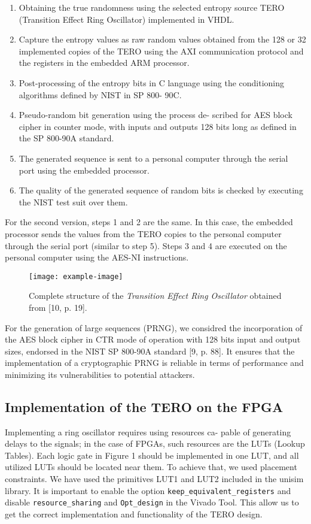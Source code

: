 \documentclass[journal]{IEEEtran}
\begin{document}
\begin{enumerate}
    \item Obtaining the true randomness using the selected entropy source TERO (Transition Effect Ring Oscillator) implemented in VHDL.
    \item Capture the entropy values as raw random values obtained from the 128 or 32 implemented copies of the TERO using the AXI communication protocol and the registers in the embedded ARM processor.
    \item Post-processing of the entropy bits in C language using the conditioning algorithms defined by NIST in SP 800- 90C.
    \item Pseudo-random bit generation using the process de- scribed for AES block cipher in counter mode, with inputs and outputs 128 bits long as defined in the SP 800-90A standard.
    \item The generated sequence is sent to a personal computer through the serial port using the embedded processor.
    \item The quality of the generated sequence of random bits is checked by executing the NIST test suit over them.
\end{enumerate}

For the second version, steps 1 and 2 are the same. In this case, the embedded processor sends the values from the TERO copies to the personal computer through the serial port (similar to step 5). Steps 3 and 4 are executed on the personal computer using the AES-NI instructions.

\begin{figure}[hbtp]
\centering
\texttt{[image: example-image]}
\caption{Complete structure of the \textit{Transition Effect Ring Oscillator} obtained from [10, p. 19].}  
\end{figure}

For the generation of large sequences (PRNG), we considred the incorporation of the AES block cipher in CTR mode of operation with 128 bits input and output sizes, endorsed in the NIST SP 800-90A standard [9, p. 88]. It ensures that the implementation of a cryptographic PRNG is reliable in terms of performance and minimizing its vulnerabilities to potential attackers.

\subsection{Implementation of the TERO on the FPGA}Implementing a ring oscillator requires using resources ca- pable of generating delays to the signals; in the case of FPGAs, such resources are the LUTs (Lookup Tables). Each logic gate in Figure 1 should be implemented in one LUT, and all utilized LUTs should be located near them. To achieve that, we used placement constraints. We have used the primitives LUT1 and LUT2 included in the unisim library. It is important to enable the option \verb+keep_equivalent_registers+ and disable \verb+resource_sharing+ and \verb+Opt_design+ in the Vivado Tool. This allow us to get the correct implementation and functionality of the TERO design.
\end{document}
